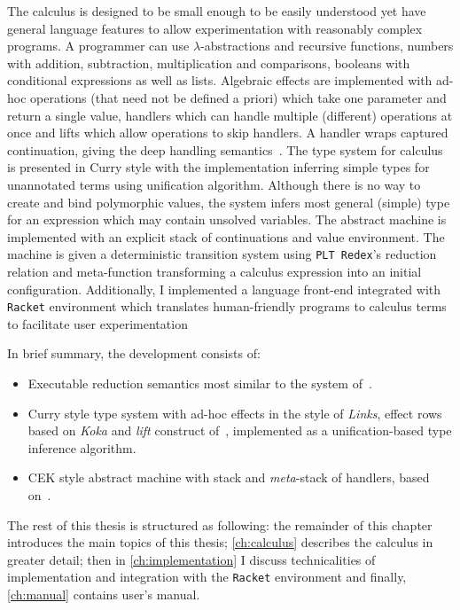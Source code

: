 \documentclass[inz, english, longabstract]{iithesis}
\newcommand{\Redex}{\texttt{PLT Redex}}
\newcommand{\Racket}{\texttt{Racket}}
\begin{document}
The calculus is designed to be small enough to be easily understood yet have general language features to allow experimentation with reasonably complex programs.
A programmer can use $\lambda$-abstractions and recursive functions, numbers with addition, subtraction, multiplication and comparisons, booleans with conditional expressions as well as lists.
Algebraic effects are implemented with ad-hoc operations (that need not be defined a priori) which take one parameter and return a single value, handlers which can handle multiple (different) operations at once and lifts which allow operations to skip handlers.
A handler wraps captured continuation, giving the deep handling semantics~\cite{Leijen2014}.
The type system for calculus is presented in Curry style with the implementation inferring simple types for unannotated terms using unification algorithm.
Although there is no way to create and bind polymorphic values, the system infers most general (simple) type for an expression which may contain unsolved variables.
The abstract machine is implemented with an explicit stack of continuations and value environment.
The machine is given a deterministic transition system using \Redex{}'s reduction relation and meta-function transforming a calculus expression into an initial configuration.
Additionally, I implemented a language front-end integrated with \Racket{} environment which translates human-friendly programs to calculus terms to facilitate user experimentation

In brief summary, the development consists of:
\begin{itemize}
  \item Executable reduction semantics most similar to the system of~\cite{Biernacki2017}.
  \item Curry style type system with ad-hoc effects in the style of \emph{Links}, effect rows based on \emph{Koka} and \emph{lift} construct of~\cite{Biernacki2017}, implemented as a unification-based type inference algorithm.
  \item CEK style abstract machine with stack and \emph{meta}-stack of handlers, based on~\cite{Hillerstrom2016}.
\end{itemize}

The rest of this thesis is structured as following: the remainder of this chapter introduces the main topics of this thesis; \autoref{ch:calculus} describes the calculus in greater detail; then in \autoref{ch:implementation} I discuss technicalities of implementation and integration with the \Racket{} environment and finally, \autoref{ch:manual} contains user's manual.
\end{document}
